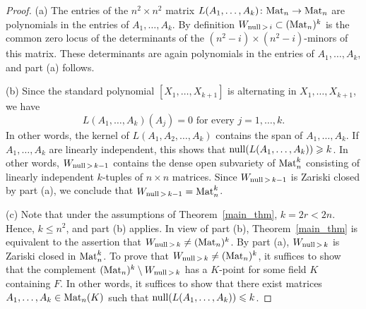 \documentclass{amsproc}
\theoremstyle{definition}
\theoremstyle{remark}
\numberwithin{equation}{section}
\newcommand{\M}{{\rm Mat}}
\newcommand{\nullity}{{\rm null}}
\begin{document}
\begin{proof} (a) The entries of the $n^2 \times n^2$ matrix 
$L(A_1, \ldots, A_k) \colon \M_n \to \M_n$ are polynomials in the entries of $A_1, \dots, A_k$. By definition $W_{\nullity \, > \, i} \subset (\M_n)^k$ 
is the common zero locus of the determinants of the $(n^2 -i) \times (n^2 -i)$-minors of this matrix. 
These determinants are again polynomials in the entries of $A_1, \dots, A_k$, and part (a) follows.

(b) Since the standard polynomial $[X_1,\dots, X_{k+1}]$ is alternating in $X_1, \dots, X_{k+1}$, we have
\[ \text{$L(A_1, \dots, A_k)(A_j) = 0$ for every $j = 1, \ldots, k$.} \] In other words, the kernel of $L(A_1,A_2,\dots,A_k)$ 
contains the span of $A_1, \dots, A_k$. If $A_1, \ldots, A_k$ are linearly independent, this shows that $\nullity(L(A_1, \ldots, A_k)) \geqslant k$.
In other words, $W_{\nullity \, > \, k-1}$  contains the dense open subvariety of $\M_n^k$ consisting of linearly independent $k$-tuples of $n \times n$ matrices.
Since $W_{\nullity \, > \, k-1}$ is Zariski closed by part (a), we conclude that $W_{\nullity \, > \, k-1} = \M_n^k$.

(c) Note that under the assumptions of Theorem~\ref{main_thm}, $k = 2r < 2n$. Hence, $k \leqslant n^2$, and part (b) 
applies. In view of part (b), Theorem~\ref{main_thm} is equivalent to the assertion that $W_{\nullity \, > \, k} \neq (\M_n)^k$. 
By part (a), $W_{\nullity \, > \, k}$ is Zariski closed in $\M_n^k$.
To prove that $W_{\nullity \, > \, k} \neq (\M_n)^k$, it suffices to show that the complement 
$(\M_n)^k \setminus W_{\nullity \, > \, k}$ has a $K$-point for some field $K$ containing $F$. 
In other words, it suffices to show that there exist matrices $A_1, \ldots, A_k \in \M_n(K)$ such that $\nullity(L(A_1, \dots, A_k)) \leqslant k$.
\end{proof}
\end{document}
